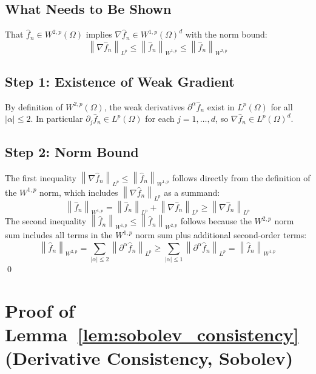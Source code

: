 \documentclass[12pt]{article}
\newcommand{\norm}[1]{\left\| #1 \right\|}
\newcommand{\Lp}{L^p(\Omega)}
\newcommand{\Wtwop}{W^{2,p}(\Omega)}
\newcommand{\fn}{\hat{f}_n}
\begin{document}
	\subsection{What Needs to Be Shown}
	
	That $\fn \in \Wtwop$ implies $\nabla \fn \in W^{1,p}(\Omega)^d$ with the
	norm bound:
	\begin{equation}
		\norm{\nabla \fn}_{L^p}
		\leq \norm{\fn}_{W^{1,p}}
		\leq \norm{\fn}_{W^{2,p}}
	\end{equation}
	
	\subsection{Step 1: Existence of Weak Gradient}
	
	By definition of $\Wtwop$, the weak derivatives $\partial^\alpha \fn$ exist
	in $\Lp$ for all $|\alpha| \leq 2$. In particular $\partial_j \fn \in \Lp$
	for each $j = 1, \ldots, d$, so $\nabla \fn \in L^p(\Omega)^d$.
	
	\subsection{Step 2: Norm Bound}
	
	The first inequality $\norm{\nabla \fn}_{L^p} \leq \norm{\fn}_{W^{1,p}}$
	follows directly from the definition of the $W^{1,p}$ norm, which includes
	$\norm{\nabla \fn}_{L^p}$ as a summand:
	\begin{equation}
		\norm{\fn}_{W^{1,p}} = \norm{\fn}_{L^p} + \norm{\nabla \fn}_{L^p}
		\geq \norm{\nabla \fn}_{L^p}
	\end{equation}
	The second inequality $\norm{\fn}_{W^{1,p}} \leq \norm{\fn}_{W^{2,p}}$
	follows because the $W^{2,p}$ norm sum includes all terms in the $W^{1,p}$
	norm sum plus additional second-order terms:
	\begin{equation}
		\norm{\fn}_{W^{2,p}} =
		\sum_{|\alpha| \leq 2} \norm{\partial^\alpha \fn}_{L^p} \geq
		\sum_{|\alpha| \leq 1} \norm{\partial^\alpha \fn}_{L^p} =
		\norm{\fn}_{W^{1,p}}
	\end{equation}
	\qed
	
	\section{Proof of Lemma~\ref{lem:sobolev_consistency}
		(Derivative Consistency, Sobolev)}
	\label{app:lem_sobolev_consistency}
	
\end{document}
